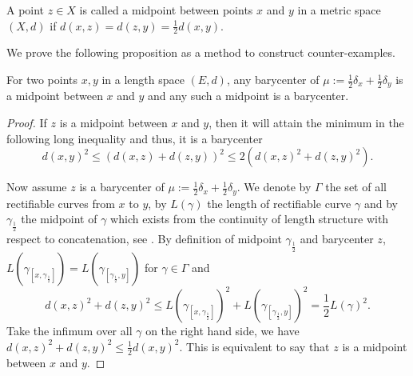 
\begin{defn}
	A point \( z \in X \) is called a midpoint between points \( x \) and \( y \)
in a metric space \( ( X , d ) \) if \( d ( x , z ) = d ( z , y ) = \frac { 1 } { 2 } d ( x , y ) \).
\end{defn}

We prove the following proposition as a method to construct counter-examples.

\begin{prop}
	\label{prop:barycenter_midpoint}
	For two points $x,y$ in a length space $(E,d)$,
	any barycenter of $\mu:=\frac{1}{2}\delta_x + \frac{1}{2}\delta_y$ 
	is a midpoint between $x$ and $y$
	and any such a midpoint is a barycenter.
\end{prop}

\begin{proof}

	If $z$ is a midpoint between $x$ and $y$,
	then it will attain the minimum in the following long inequality
	and thus, it is a barycenter
	\[
		d(x,y)^2 \leq \left(d(x,z) + d(z,y)\right)^2 \leq 2\left(d(x,z)^2+ d(z,y)^2\right).
	\]

	Now assume $z$ is a barycenter of $\mu:=\frac{1}{2}\delta_x + \frac{1}{2} \delta_y$.
	We denote by $\Gamma$ the set of all rectifiable curves from $x$ to $y$,
	by $L(\gamma)$ the length of rectifiable curve $\gamma$
	and by $\gamma_\frac{1}{2}$ the midpoint of $\gamma$ which exists from the continuity of length
	structure with respect to concatenation, see .
	By definition of midpoint $\gamma_{\frac{1}{2}}$ and barycenter $z$,
	$L(\gamma_{[x, \gamma_\frac{1}{2}]}) = L(\gamma_{[\gamma_\frac{1}{2}, y]})$ for $\gamma \in \Gamma$ and
	\[
		d(x,z)^2 + d(z,y)^2 \leq {L(\gamma_{[x, \gamma_\frac{1}{2}]})}^2 + {L(\gamma_{[\gamma_\frac{1}{2}, y]})}^2=\frac{1}{2} {L(\gamma)}^2.
	\]
	Take the infimum over all $\gamma$ on the right hand side, we have $d(x,z)^2 + d(z,y)^2 \leq \frac{1}{2}d(x,y)^2$.
	This is equivalent to say that $z$ is a midpoint between $x$ and $y$.
\end{proof}


